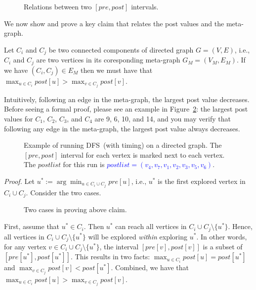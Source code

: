 \begin{figure}[h!]
\centering{}
\caption{Relations between two $[pre,post]$ intervals.}
\label{fig:dfs-interval}
\end{figure}

We now show and prove a key claim that relates the post values and the meta-graph.

\begin{claim}
Let $C_i$ and $C_j$ be two connected components of directed graph $G = (V, E)$, i.e., $C_i$ and $C_j$ are two
vertices in its coresponding meta-graph $G_M = (V_M, E_M)$. If we have $(C_i, C_j) \in E_M$ then
we must have that $\max_{u\in C_i} post[u] > \max_{v\in C_j} post[v]$.
\end{claim}

Intuitively, following an edge in the meta-graph, the largest post value decreases.
Before seeing a formal proof, please see an example in Figure~\ref{fig:dfs}:
the largest post values for $C_1$, $C_2$, $C_3$, and $C_4$ are 9, 6, 10, and 14,
and you may verify that following any edge in the meta-graph, the largest post value always decreases.

\begin{figure}[h!]
\centering{}
\caption{Example of running DFS~(with timing) on a directed graph. The $[pre,post]$ interval for each vertex
is marked next to each vertex.  The $postlist$ for this run is \textcolor{blue}{$postlist = (v_4,v_7,v_1,v_2,v_3,v_5,v_6)$}.  }
\label{fig:dfs}
\end{figure}



\emph{Proof.} Let $u^* := \arg\min_{u\in C_i\cup C_j} pre[u]$, i.e., $u^*$ is the first explored vertex in $C_i\cup C_j$.
Consider the two cases. 

\begin{figure}[h!]
\centering{}
\caption{Two cases in proving above claim.}
\label{fig:meta}
\end{figure}

First, assume that $u^* \in C_i$. Then $u^*$ can reach all vertices in $C_i\cup C_j\setminus \{u^*\}$.
Hence, all vertices in $C_i\cup C_j\setminus \{u^*\}$ will be explored \emph{within} exploring $u^*$.
In other words, for any vertex $v\in C_i\cup C_j\setminus \{u^*\}$, the interval $[pre[v], post[v]]$
is a subset of $[pre[u^*], post[u^*]]$. This results in two facts:
$\max_{u\in C_i} post[u] = post[u^*]$ and $\max_{v\in C_j} post[v] < post[u^*]$.
Combined, we have that $\max_{u\in C_i} post[u] > \max_{v\in C_j} post[v]$.

